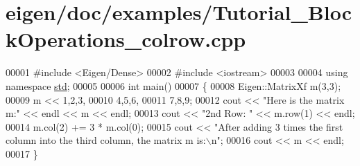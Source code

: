 \hypertarget{eigen_2doc_2examples_2_tutorial___block_operations__colrow_8cpp_source}{}\section{eigen/doc/examples/\+Tutorial\+\_\+\+Block\+Operations\+\_\+colrow.cpp}
\label{eigen_2doc_2examples_2_tutorial___block_operations__colrow_8cpp_source}

\begin{DoxyCode}
00001 \textcolor{preprocessor}{#include <Eigen/Dense>}
00002 \textcolor{preprocessor}{#include <iostream>}
00003 
00004 \textcolor{keyword}{using namespace }\hyperlink{namespacestd}{std};
00005 
00006 \textcolor{keywordtype}{int} main()
00007 \{
00008   Eigen::MatrixXf m(3,3);
00009   m << 1,2,3,
00010        4,5,6,
00011        7,8,9;
00012   cout << \textcolor{stringliteral}{"Here is the matrix m:"} << endl << m << endl;
00013   cout << \textcolor{stringliteral}{"2nd Row: "} << m.row(1) << endl;
00014   m.col(2) += 3 * m.col(0);
00015   cout << \textcolor{stringliteral}{"After adding 3 times the first column into the third column, the matrix m is:\(\backslash\)n"};
00016   cout << m << endl;
00017 \}
\end{DoxyCode}
